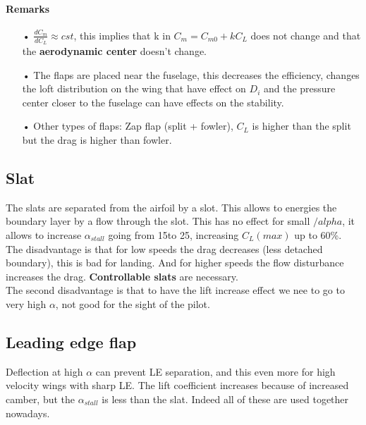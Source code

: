 \begin{center}
\begin{minipage}{0.3\textwidth}
	\end{minipage}
	\end{center}
	
\paragraph{Remarks}
	\begin{itemize}
	\item[•] $\frac{dC_m}{dC_L}\approx cst$, this implies that k in $C_m = C_{m0} + k C_L$ does not change and that the \textbf{aerodynamic center} doesn't change. 
	
	\item[•] The flaps are placed near the fuselage, this decreases the efficiency, changes the loft distribution on the wing that have effect on $D_i$ and the pressure center closer to the fuselage can have effects on the stability. 
	
	\item[•] Other types of flaps: Zap flap (split + fowler), $C_L$ is higher than the split but the drag is higher than fowler. 
	\end{itemize}		
	
\subsection{Slat}
	The slats are separated from the airfoil by a slot. This allows to energies the boundary layer by a flow through the slot. This has no effect for small $/alpha$, it allows to increase $\alpha _{stall}$ going from 15\degres to 25\degres, increasing $C_L(max)$ up to 60\%. The disadvantage is that for low speeds the drag decreases (less detached boundary), this is bad for landing. And for higher speeds the flow disturbance increases the drag. \textbf{Controllable slats} are necessary. \\
	
	The second disadvantage is that to have the lift increase effect we nee to go to very high $\alpha$, not good for the sight of the pilot. 
	
\subsection{Leading edge flap}
	Deflection at high $\alpha$ can prevent LE separation, and this even more for high velocity wings with sharp LE. The lift coefficient increases because of increased camber, but the $\alpha _{stall}$ is less than the slat. Indeed all of these are used together nowadays. 
	
